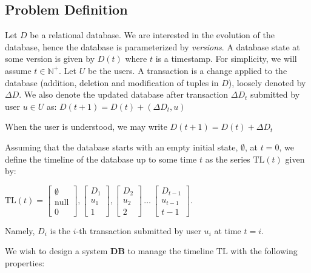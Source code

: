 \subsection{Problem Definition}
\label{sec:problem-def}

\newcommand{\D}{D}
\newcommand{\U}{U}

Let $\D$ be a relational database.  We are interested in the evolution
of the database, hence the database is parameterized by {\em versions}. 
A database state at some version is given by $\D(t)$
where $t$ is a timestamp.  For simplicity, we will assume $t\in\mathbb{N}^+$.
Let $\U$ be the users.  A transaction is a change applied to the database
(addition, deletion and modification of tuples in $\D$), loosely denoted by
$\Delta\D$.  We also denote the updated database after transaction $\Delta D_t$
submitted by user $u\in\U$ as:
$\D(t+1) = \D(t)+(\Delta\D_t, u)$

When the user is understood, we may write
$\D(t+1) = \D(t) + \Delta D_t$

Assuming that the database starts with an empty initial state, $\emptyset$, at
$t=0$, we define the timeline of the database up to some time $t$ as the series
$\mathrm{TL}(t)$ given by:

$ \mathrm{TL}(t) = 
    \left[\begin{array}{c} \emptyset \\ \mathrm{null} \\ 0 \end{array}\right],
    \left[\begin{array}{c} \D_1 \\ u_1 \\ 1 \end{array}\right],
    \left[\begin{array}{c} \D_2 \\ u_2 \\ 2 \end{array}\right]
    \,\dots\,
    \left[\begin{array}{c} \D_{t-1} \\ u_{t-1} \\ t-1 \end{array}\right].
    $

Namely, $\D_i$ is the $i$-th transaction submitted by user $u_i$ at time $t=i$.

We wish to design a system $\mathbf{DB}$ to manage the timeline $\mathrm{TL}$ with
the following properties:

